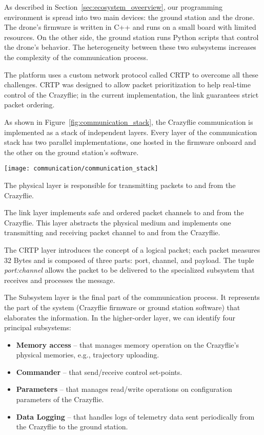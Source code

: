 As described in Section~\ref{sec:ecosystem_oveerview}, our programming environment is spread into two main devices: the ground station and the drone.
The drone's firmware is written in C++ and runs on a small board with limited resources. On the other side, the ground station runs Python scripts
that control the drone's behavior. The heterogeneity between these two subsystems increases the complexity of the communication process.

The platform uses a custom network protocol called CRTP to overcome all these challenges. 
CRTP was designed to allow packet prioritization to help real-time control of the Crazyflie; in the current implementation, the link guarantees strict packet ordering.

As shown in Figure~\ref{fig:communication_stack}, the Crazyflie communication is implemented as a stack of independent layers.
Every layer of the communication stack has two parallel implementations, one hosted in the firmware onboard and the other on the ground station's software.

\begin{SCfigure}[\sidecaptionrelwidth][tb]
    \texttt{[image: communication/communication\_stack]}
    \caption[The Crazyflie communication stack]{The Crazyflie communication stack is composed of 4 independent layers: Subsystems, CRTP, Link, Physical medium}
    \label{fig:communication_stack}
\end{SCfigure}

The physical layer is responsible for transmitting packets to and from the Crazyflie. 

The link layer implements safe and ordered packet channels to and from the Crazyflie. This layer abstracts the physical medium and implements one transmitting and receiving packet channel to and from the Crazyflie.

The CRTP layer introduces the concept of a logical packet; each packet measures 32 Bytes and is composed of three parts: port, channel, and payload.
The tuple \textit{port:channel} allows the packet to be delivered to the specialized subsystem that receives and processes the message.

The Subsystem layer is the final part of the communication process. It represents the part of the system (Crazyflie firmware or ground station software) that elaborates the information.
In the higher-order layer, we can identify four principal subsystems:
\begin{itemize}
    \item \textbf{Memory access} -- that manages memory operation on the Crazyflie's physical memories, e.g., trajectory uploading.
    \item \textbf{Commander} -- that send/receive control set-points.
    \item \textbf{Parameters} -- that manages read/write operations on configuration parameters of the Crazyflie.
    \item \textbf{Data Logging} -- that handles logs of telemetry data sent periodically from the Crazyflie to the ground station. 
\end{itemize} 

